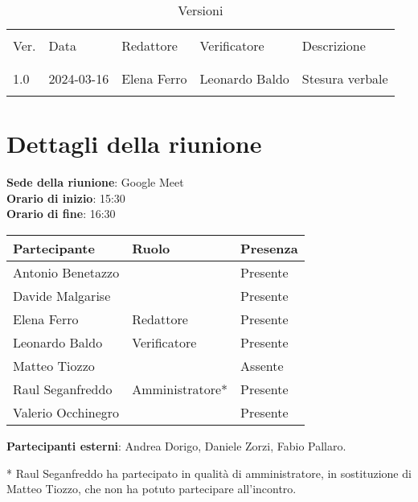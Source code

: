 \documentclass[italian,12pt]{article}
\begin{document}


\newpage



\begin{table}[!h]
	\caption{Versioni}
	\footnotesize
	\begin{center}
		\begin{tabular}{ l l l l p{6cm} }
			\hline                                                             \\[-2ex]
			Ver. & Data       & Redattore   & Verificatore   & Descrizione     \\
			\\[-2ex] \hline \\[-1.5ex]
			1.0  & 2024-03-16 & Elena Ferro & Leonardo Baldo & Stesura verbale \\
			\\[-1.5ex] \hline
		\end{tabular}
	\end{center}
\end{table}

\newpage

\tableofcontents

\newpage

\section{Dettagli della riunione}


\textbf{Sede della riunione}: Google Meet\\
\textbf{Orario di inizio}: 15:30\\
\textbf{Orario di fine}: 16:30\\

\begin{flushleft}
	\begin{table}[!h]
		\begin{tabular}{ |l|l|l| }
			\hline
			\textbf{Partecipante} & \textbf{Ruolo}  & \textbf{Presenza} \\
			\hline
			Antonio Benetazzo     &                 & Presente          \\
			Davide Malgarise      &                 & Presente          \\
			Elena Ferro           & Redattore       & Presente          \\
			Leonardo Baldo        & Verificatore    & Presente          \\
			Matteo Tiozzo         &                 & Assente           \\
			Raul Seganfreddo      & Amministratore* & Presente          \\
			Valerio Occhinegro    &                 & Presente          \\
			\hline
		\end{tabular}
	\end{table}
	\textbf{Partecipanti esterni}: Andrea Dorigo, Daniele Zorzi, Fabio Pallaro.\\
\end{flushleft}
* Raul Seganfreddo ha partecipato in qualità di amministratore, in sostituzione di
Matteo Tiozzo, che non ha potuto partecipare all'incontro.
\end{document}
